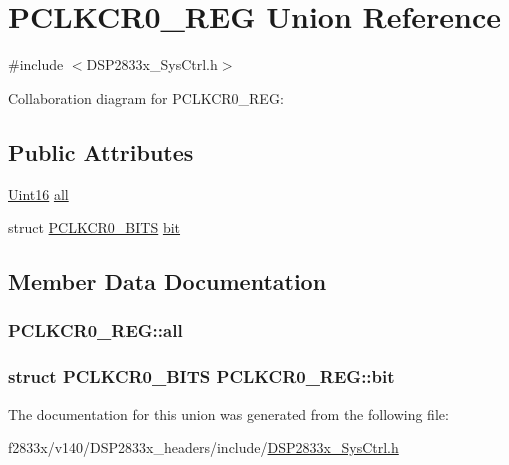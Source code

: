 \hypertarget{union_p_c_l_k_c_r0___r_e_g}{}\section{P\+C\+L\+K\+C\+R0\+\_\+\+R\+E\+G Union Reference}
\label{union_p_c_l_k_c_r0___r_e_g}


{\ttfamily \#include $<$D\+S\+P2833x\+\_\+\+Sys\+Ctrl.\+h$>$}



Collaboration diagram for P\+C\+L\+K\+C\+R0\+\_\+\+R\+E\+G\+:
\subsection*{Public Attributes}
\begin{DoxyCompactItemize}
\item 
\hyperlink{_d_s_p2833x___device_8h_a59a9f6be4562c327cbfb4f7e8e18f08b}{Uint16} \hyperlink{union_p_c_l_k_c_r0___r_e_g_acb635bdd7caee4ee7036985307948b7e}{all}
\item 
struct \hyperlink{struct_p_c_l_k_c_r0___b_i_t_s}{P\+C\+L\+K\+C\+R0\+\_\+\+B\+I\+T\+S} \hyperlink{union_p_c_l_k_c_r0___r_e_g_a57362b47d4a11c11099897de92827f9e}{bit}
\end{DoxyCompactItemize}


\subsection{Member Data Documentation}
\hypertarget{union_p_c_l_k_c_r0___r_e_g_acb635bdd7caee4ee7036985307948b7e}{}
\subsubsection[{all}]{ P\+C\+L\+K\+C\+R0\+\_\+\+R\+E\+G\+::all}\label{union_p_c_l_k_c_r0___r_e_g_acb635bdd7caee4ee7036985307948b7e}
\hypertarget{union_p_c_l_k_c_r0___r_e_g_a57362b47d4a11c11099897de92827f9e}{}
\subsubsection[{bit}]{\setlength{\rightskip}{0pt plus 5cm}struct {\bf P\+C\+L\+K\+C\+R0\+\_\+\+B\+I\+T\+S} P\+C\+L\+K\+C\+R0\+\_\+\+R\+E\+G\+::bit}\label{union_p_c_l_k_c_r0___r_e_g_a57362b47d4a11c11099897de92827f9e}


The documentation for this union was generated from the following file\+:\begin{DoxyCompactItemize}
\item 
f2833x/v140/\+D\+S\+P2833x\+\_\+headers/include/\hyperlink{_d_s_p2833x___sys_ctrl_8h}{D\+S\+P2833x\+\_\+\+Sys\+Ctrl.\+h}\end{DoxyCompactItemize}
